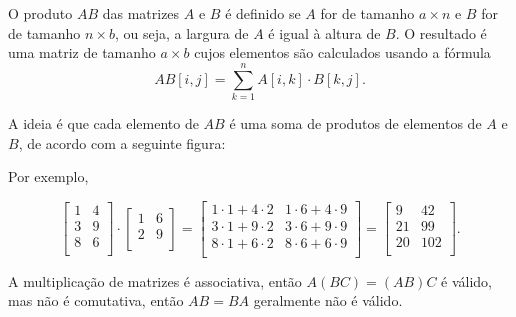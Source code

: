 O produto $AB$ das matrizes $A$ e $B$
é definido se $A$ for de tamanho $a \times n$
e $B$ for de tamanho $n \times b$, ou seja,
a largura de $A$ é igual à altura de $B$.
O resultado é uma matriz de tamanho $a \times b$
cujos elementos são calculados usando a fórmula
\[
AB[i,j] = \sum_{k=1}^n A[i,k] \cdot B[k,j].
\]

A ideia é que cada elemento de $AB$
é uma soma de produtos de elementos de $A$ e $B$,
de acordo com a seguinte figura:

\begin{center}
\end{center}

Por exemplo,

\[
 \begin{bmatrix}
  1 & 4 \\
  3 & 9 \\
  8 & 6 \\
 \end{bmatrix}
\cdot
 \begin{bmatrix}
  1 & 6 \\
  2 & 9 \\
 \end{bmatrix}
=
 \begin{bmatrix}
  1 \cdot 1 + 4 \cdot 2 & 1 \cdot 6 + 4 \cdot 9 \\
  3 \cdot 1 + 9 \cdot 2 & 3 \cdot 6 + 9 \cdot 9 \\
  8 \cdot 1 + 6 \cdot 2 & 8 \cdot 6 + 6 \cdot 9 \\
 \end{bmatrix}
=
 \begin{bmatrix}
  9 & 42 \\
  21 & 99 \\
  20 & 102 \\
 \end{bmatrix}.
\]

A multiplicação de matrizes é associativa,
então $A(BC)=(AB)C$ é válido,
mas não é comutativa,
então $AB = BA$ geralmente não é válido.

